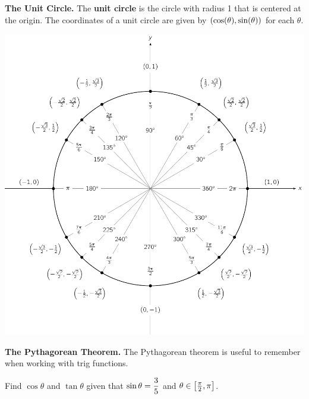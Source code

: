 \documentclass[12pt]{article}
\begin{document}
\vspace{5mm}

\textbf{The Unit Circle.} The \textbf{unit circle} is the circle with radius 1 that is centered at the origin. The coordinates of a unit circle are given by $\left(\cos(\theta),\sin(\theta)\right)$ for each $\theta$. %

\begin{center}
\includegraphics[scale=1]{MATH_1060_Section_1-4_Unit_Circle.pdf}
\end{center}

\newpage

\textbf{The Pythagorean Theorem.} The Pythagorean theorem is useful to remember when working with trig functions.

\vspace{3mm}


\vspace{3mm}

\Example Find $\cos\theta$ and $\tan\theta$ given that $\sin\theta=\displaystyle\frac{3}{5}$ and $\theta\in\left[\frac{\pi}{2},\pi\right]$.
\end{document}
